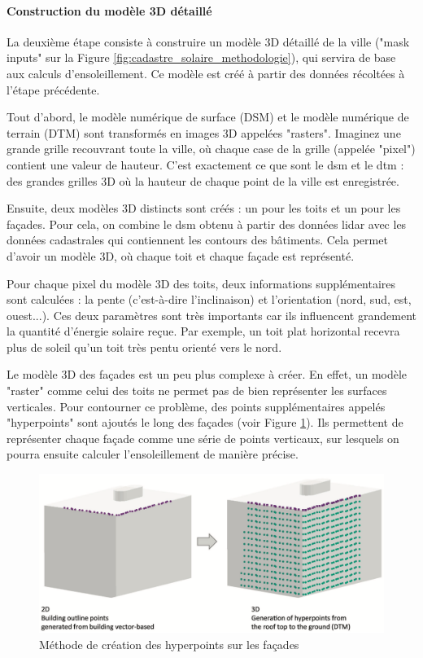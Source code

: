 \paragraph{Construction du modèle 3D détaillé}
\par{La deuxième étape consiste à construire un modèle 3D détaillé de la ville ("mask inputs" sur la Figure \ref{fig:cadastre_solaire_methodologie}), qui servira de base aux calculs d'ensoleillement. Ce modèle est créé à partir des données récoltées à l'étape précédente.}
\par{Tout d'abord, le modèle numérique de surface (DSM) et le modèle numérique de terrain (DTM) sont transformés en images 3D appelées "rasters". Imaginez une grande grille recouvrant toute la ville, où chaque case de la grille (appelée "pixel") contient une valeur de hauteur. C'est exactement ce que sont le \acrshort{dsm} et le \acrshort{dtm} : des grandes grilles 3D où la hauteur de chaque point de la ville est enregistrée.}
\par{Ensuite, deux modèles 3D distincts sont créés : un pour les toits et un pour les façades. Pour cela, on combine le \acrshort{dsm} obtenu à partir des données \gls{lidar} avec les données cadastrales qui contiennent les contours des bâtiments. Cela permet d'avoir un modèle 3D, où chaque toit et chaque façade est représenté.}
\par{Pour chaque pixel du modèle 3D des toits, deux informations supplémentaires sont calculées : la pente (c'est-à-dire l'inclinaison) et l'orientation (nord, sud, est, ouest...). Ces deux paramètres sont très importants car ils influencent grandement la quantité d'énergie solaire reçue. Par exemple, un toit plat horizontal recevra plus de soleil qu'un toit très pentu orienté vers le nord.}
\par{Le modèle 3D des façades est un peu plus complexe à créer. En effet, un modèle "raster" comme celui des toits ne permet pas de bien représenter les surfaces verticales. Pour contourner ce problème, des points supplémentaires appelés "hyperpoints" sont ajoutés le long des façades (voir Figure \ref{fig:cadastre_solaire_hyperpoints}). Ils permettent de représenter chaque façade comme une série de points verticaux, sur lesquels on pourra ensuite calculer l'ensoleillement de manière précise.}
\begin{figure}[H]
    \centering
    \includegraphics[width=1\linewidth]{02-main//figures/ch2/cadastre_solaire_hyperpoints.png}
    \caption{Méthode de création des hyperpoints sur les façades \cite{desthieux_solar_2018}}
    \label{fig:cadastre_solaire_hyperpoints}
\end{figure}

